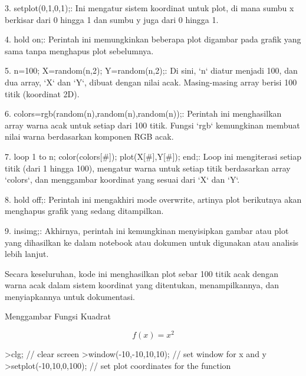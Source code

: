 \documentclass{article}
\begin{document}
\begin{eulernotebook}
\begin{eulercomment}
\begin{eulercomment}
\begin{eulercomment}
3. setplot(0,1,0,1);: Ini mengatur sistem koordinat untuk plot, di
mana sumbu x berkisar dari 0 hingga 1 dan sumbu y juga dari 0 hingga
1.

4. hold on;: Perintah ini memungkinkan beberapa plot digambar pada
grafik yang sama tanpa menghapus plot sebelumnya.

5. n=100; X=random(n,2); Y=random(n,2);: Di sini, `n` diatur menjadi
100, dan dua array, `X` dan `Y`, dibuat dengan nilai acak.
Masing-masing array berisi 100 titik (koordinat 2D).

6. colors=rgb(random(n),random(n),random(n));: Perintah ini
menghasilkan array warna acak untuk setiap dari 100 titik. Fungsi
`rgb` kemungkinan membuat nilai warna berdasarkan komponen RGB acak.

7. loop 1 to n; color(colors[#]); plot(X[#],Y[#]); end;: Loop ini
mengiterasi setiap titik (dari 1 hingga 100), mengatur warna untuk
setiap titik berdasarkan array `colors`, dan menggambar koordinat yang
sesuai dari `X` dan `Y`.

8. hold off;: Perintah ini mengakhiri mode overwrite, artinya plot
berikutnya akan menghapus grafik yang sedang ditampilkan.

9. insimg;: Akhirnya, perintah ini kemungkinan menyisipkan gambar atau
plot yang dihasilkan ke dalam notebook atau dokumen untuk digunakan
atau analisis lebih lanjut.

Secara keseluruhan, kode ini menghasilkan plot sebar 100 titik acak
dengan warna acak dalam sistem koordinat yang ditentukan,
menampilkannya, dan menyiapkannya untuk dokumentasi.\\
\end{eulercomment}
\eulersubheading{}
\begin{eulercomment}
Menggambar Fungsi Kuadrat\\
\end{eulercomment}
\begin{eulerformula}
\[
f(x)=x^2
\]
\end{eulerformula}
\begin{eulercomment}
\end{eulercomment}
\begin{eulerprompt}
>clg; // clear screen
>window(-10,-10,10,10); // set window for x and y
>setplot(-10,10,0,100); // set plot coordinates for the function
\end{eulerprompt}
\begin{euleroutput}
  

\end{euleroutput}
\end{eulercomment}
\end{eulercomment}
\end{eulernotebook}
\end{document}
